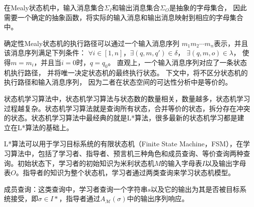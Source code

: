 在Mealy状态机中，输入消息集合$\Sigma_{I}$和输出消息集合$\Sigma_{O}$是抽象的字母集合，
因此需要一个确定的抽象函数，将实际的输入消息和输出消息映射到相应的字母集合中。


确定性Mealy状态机的执行路径可以通过一个输入消息序列
$m_1m_2 \cdots m_n$表示，并且该消息序列满足下列条件：
$\forall i\in [1,n]$，$\exists (q, m, q')\in \delta$，
$\exists (q, m, o)\in \lambda $，
使得$m = m_i$，并且当$i=0$时，$q = q_0$。
直观上，一个输入消息序列对应了一条状态机执行路径，
并将唯一决定状态机的最终执行状态。
下文中，将不区分状态机的执行路径和输入消息序列，
因为二者在状态空间的可达性分析中是等价的。




状态机学习算法中，状态机学习算法与状态数的数量相关，数量越多，状态机学习过程越复杂。状态机学习算法就是查询所有状态，合并等价的状态，拆分存在冲突的状态。状态机学习算法中最经典的就是L*算法，很多最新的状态机学习都是建立在L*算法的基础上。










L*算法可以用于学习目标系统的有限状态机（Finite State Machine，FSM），在学习算法中，包括了学习者、指导者、预言机三种角色和成员查询、等价查询两种查询。初始状态下，学习者的初始知识为米利状态机$M$的输入字母表$I$以及输出字母表$O$。指导者的知识为整个状态机，学习者通过两类查询来学习状态机模型。

成员查询：这类查询中，学习者查询一个字符串$s$以及它的输出为其是否被目标系统接受，即$\sigma \in I*$，指导者通过${{A}_{\mathsf{\mathcal{M}}}}(\sigma )$中的输出序列响应。

